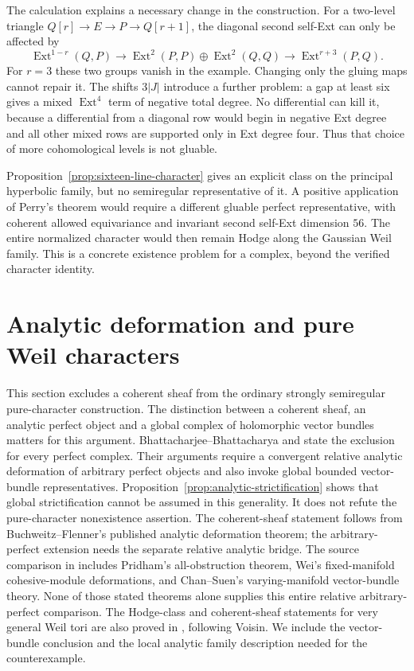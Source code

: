 \documentclass[11pt]{article}
\theoremstyle{definition}
\theoremstyle{remark}
\begin{document}
The calculation explains a necessary change in the construction. For a two-level triangle $Q[r]\to E\to P\to Q[r+1]$, the diagonal second self-Ext can only be affected by
\[
 \operatorname{Ext}^{1-r}(Q,P)\longrightarrow
 \operatorname{Ext}^2(P,P)\oplus\operatorname{Ext}^2(Q,Q)
 \longrightarrow\operatorname{Ext}^{r+3}(P,Q).
\]
For $r=3$ these two groups vanish in the example. Changing only the gluing maps cannot repair it. The shifts $3|J|$ introduce a further problem: a gap at least six gives a mixed $\operatorname{Ext}^4$ term of negative total degree. No differential can kill it, because a differential from a diagonal row would begin in negative Ext degree and all other mixed rows are supported only in Ext degree four. Thus that choice of more cohomological levels is not gluable.

Proposition~\ref{prop:sixteen-line-character} gives an explicit class on the principal hyperbolic family, but no semiregular representative of it. A positive application of Perry's theorem would require a different gluable perfect representative, with coherent allowed equivariance and invariant second self-Ext dimension $56$. The entire normalized character would then remain Hodge along the Gaussian Weil family. This is a concrete existence problem for a complex, beyond the verified character identity.
\section{Analytic deformation and pure Weil characters}
\label{sec:analytic-weil-sheaves}

This section excludes a coherent sheaf from the ordinary strongly
semiregular pure-character construction.  The distinction between a
coherent sheaf, an analytic perfect object and a global complex of
holomorphic vector bundles matters for this argument.
Bhattacharjee--Bhattacharya \cite[Theorem~A7]{BBK3Sixfolds} and
\cite[Theorem~10]{BBSecantObjects} state the exclusion for every
perfect complex.  Their arguments require a convergent relative analytic deformation
of arbitrary perfect objects and also invoke global bounded
vector-bundle representatives. Proposition~\ref{prop:analytic-strictification}
shows that global strictification cannot be assumed in this generality.
It does not refute the pure-character nonexistence assertion.
The coherent-sheaf statement follows from Buchweitz--Flenner's
published analytic deformation theorem; the arbitrary-perfect
extension needs the separate relative analytic bridge.
The source comparison in \cite[Section~]{CompanionA}
includes Pridham's all-obstruction theorem, Wei's fixed-manifold
cohesive-module deformations, and Chan--Suen's varying-manifold
vector-bundle theory. None of those stated theorems alone supplies
this entire relative arbitrary-perfect comparison.
The Hodge-class and coherent-sheaf statements for very general
Weil tori are also proved in \cite[Lemmas~2--3 and Proposition~2]{BBSecantObjects},
following Voisin.  We include the vector-bundle conclusion and
the local analytic family description needed for the counterexample.
\end{document}
